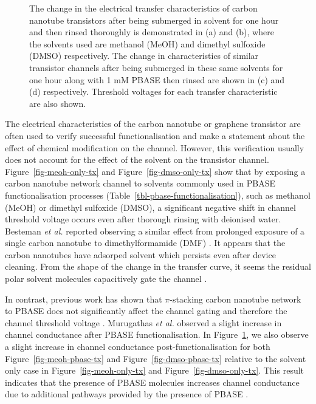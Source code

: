 \documentclass[
  a4paper,
]{scrbook}
\begin{document}
\begin{figure}
\begin{minipage}[t]{0.50\linewidth}
{{}

}

\subcaption{\label{fig-dmso-pbase-tx}}
\end{minipage}%

\caption{\label{fig-PBASE-vs-solvent-only}The change in the electrical
transfer characteristics of carbon nanotube transistors after being
submerged in solvent for one hour and then rinsed thoroughly is
demonstrated in (a) and (b), where the solvents used are methanol (MeOH)
and dimethyl sulfoxide (DMSO) respectively. The change in
characteristics of similar transistor channels after being submerged in
these same solvents for one hour along with 1 mM PBASE then rinsed are
shown in (c) and (d) respectively. Threshold voltages for each transfer
characteristic are also shown.}

\end{figure}

The electrical characteristics of the carbon nanotube or graphene
transistor are often used to verify successful functionalisation and
make a statement about the effect of chemical modification on the
channel. However, this verification usually does not account for the
effect of the solvent on the transistor channel.
Figure~\ref{fig-meoh-only-tx} and Figure~\ref{fig-dmso-only-tx} show
that by exposing a carbon nanotube network channel to solvents commonly
used in PBASE functionalisation processes
(Table~\ref{tbl-pbase-functionalisation}), such as methanol (MeOH) or
dimethyl sulfoxide (DMSO), a significant negative shift in channel
threshold voltage occurs even after thorough rinsing with deionised
water. Besteman \emph{et al.} reported observing a similar effect from
prolonged exposure of a single carbon nanotube to dimethylformamide
(DMF) \autocite{Besteman2003}. It appears that the carbon nanotubes have
adsorped solvent which persists even after device cleaning. From the
shape of the change in the transfer curve, it seems the residual polar
solvent molecules capacitively gate the channel
\autocite{Artyukhin2006,Heller2008}.

In contrast, previous work has shown that \(\pi\)-stacking carbon
nanotube network to PBASE does not significantly affect the channel
gating and therefore the channel threshold voltage
\autocite{Besteman2003,Murugathas2019b}. Murugathas \emph{et al.}
observed a slight increase in channel conductance after PBASE
functionalisation. In Figure~\ref{fig-PBASE-vs-solvent-only}, we also
observe a slight increase in channel conductance post-functionalisation
for both Figure~\ref{fig-meoh-pbase-tx} and
Figure~\ref{fig-dmso-pbase-tx} relative to the solvent only case in
Figure~\ref{fig-meoh-only-tx} and Figure~\ref{fig-dmso-only-tx}. This
result indicates that the presence of PBASE molecules increases channel
conductance due to additional pathways provided by the presence of PBASE
\autocite{Heller2008,Murugathas2019b}.
\end{document}
